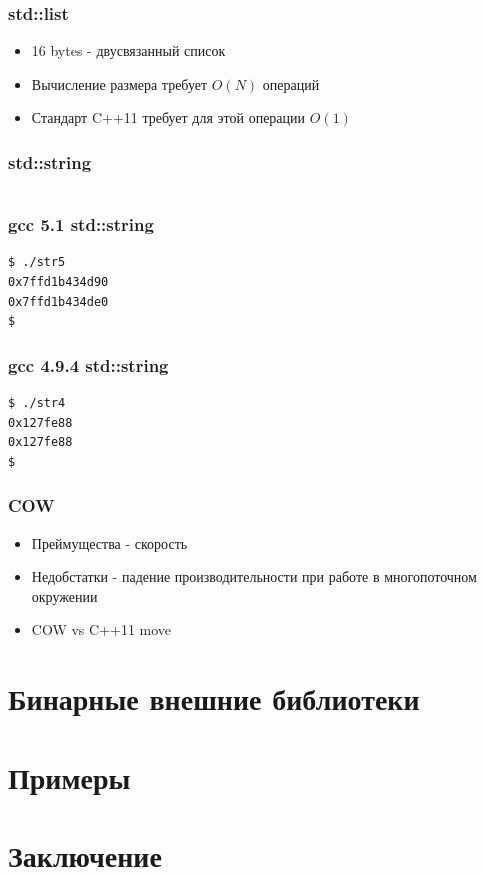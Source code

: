 \documentclass{beamer}
\begin{document}
\begin{frame}[fragile]
\frametitle{std::list}
\begin{itemize}
\item 16 bytes - двусвязанный список
\item Вычисление размера требует $O(N)$ операций
\item Стандарт C++11 требует для этой операции $O(1)$
\end{itemize}
\end{frame}

\begin{frame}[fragile]
\frametitle{std::string}
\inputminted{c++}{../src/str.cpp}
\end{frame}

\begin{frame}[fragile]
\frametitle{gcc 5.1 std::string}
\begin{verbatim}
$ ./str5
0x7ffd1b434d90
0x7ffd1b434de0
$
\end{verbatim}
\end{frame}

\begin{frame}[fragile]
\frametitle{gcc 4.9.4 std::string}
\begin{verbatim}
$ ./str4
0x127fe88
0x127fe88
$
\end{verbatim}
\end{frame}


\begin{frame}[fragile]
\frametitle{COW}
\begin{itemize}
\item Преймущества - скорость
\item Недобстатки - падение производительности при работе в
  многопоточном окружении
\item COW vs C++11 move
\end{itemize}
\end{frame}


\section{Бинарные внешние библиотеки}

\section{Примеры}

\section{Заключение}
\end{document}
